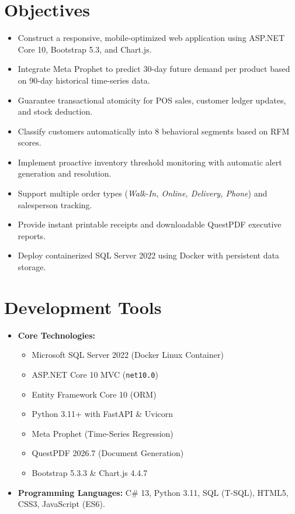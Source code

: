\documentclass[12pt,a4paper]{report}
\begin{document}
\section{Objectives}
\begin{itemize}
    \item Construct a responsive, mobile-optimized web application using ASP.NET Core 10, Bootstrap 5.3, and Chart.js.
    \item Integrate Meta Prophet to predict 30-day future demand per product based on 90-day historical time-series data.
    \item Guarantee transactional atomicity for POS sales, customer ledger updates, and stock deduction.
    \item Classify customers automatically into 8 behavioral segments based on RFM scores.
    \item Implement proactive inventory threshold monitoring with automatic alert generation and resolution.
    \item Support multiple order types (\textit{Walk-In, Online, Delivery, Phone}) and salesperson tracking.
    \item Provide instant printable receipts and downloadable QuestPDF executive reports.
    \item Deploy containerized SQL Server 2022 using Docker with persistent data storage.
\end{itemize}

\section{Development Tools}
\begin{itemize}
    \item \textbf{Core Technologies:}
    \begin{itemize}
        \item Microsoft SQL Server 2022 (Docker Linux Container)
        \item ASP.NET Core 10 MVC (\texttt{net10.0})
        \item Entity Framework Core 10 (ORM)
        \item Python 3.11+ with FastAPI \& Uvicorn
        \item Meta Prophet (Time-Series Regression)
        \item QuestPDF 2026.7 (Document Generation)
        \item Bootstrap 5.3.3 \& Chart.js 4.4.7
    \end{itemize}
    \item \textbf{Programming Languages:} C\# 13, Python 3.11, SQL (T-SQL), HTML5, CSS3, JavaScript (ES6).
\end{itemize}
\end{document}
